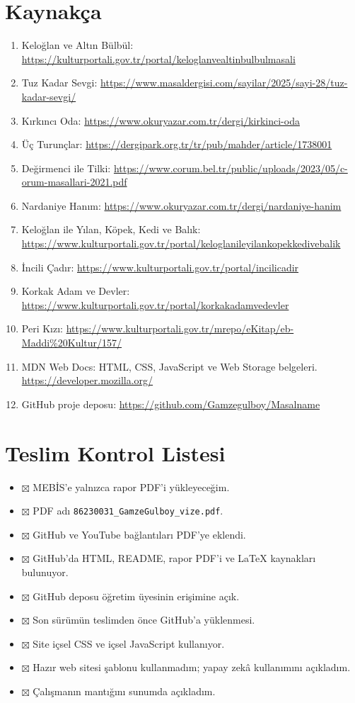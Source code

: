 \documentclass[10pt,a4paper]{article}
\begin{document}
\section{Kaynakça}
\begin{enumerate}\sloppy
\item Keloğlan ve Altın Bülbül: \url{https://kulturportali.gov.tr/portal/keloglanvealtinbulbulmasali}
\item Tuz Kadar Sevgi: \url{https://www.masaldergisi.com/sayilar/2025/sayi-28/tuz-kadar-sevgi/}
\item Kırkıncı Oda: \url{https://www.okuryazar.com.tr/dergi/kirkinci-oda}
\item Üç Turunçlar: \url{https://dergipark.org.tr/tr/pub/mahder/article/1738001}
\item Değirmenci ile Tilki: \url{https://www.corum.bel.tr/public/uploads/2023/05/c-orum-masallari-2021.pdf}
\item Nardaniye Hanım: \url{https://www.okuryazar.com.tr/dergi/nardaniye-hanim}
\item Keloğlan ile Yılan, Köpek, Kedi ve Balık: \url{https://www.kulturportali.gov.tr/portal/keloglanileyilankopekkedivebalik}
\item İncili Çadır: \url{https://www.kulturportali.gov.tr/portal/incilicadir}
\item Korkak Adam ve Devler: \url{https://www.kulturportali.gov.tr/portal/korkakadamvedevler}
\item Peri Kızı: \url{https://www.kulturportali.gov.tr/mrepo/eKitap/eb-Maddi%20Kultur/157/}
\item MDN Web Docs: HTML, CSS, JavaScript ve Web Storage belgeleri. \url{https://developer.mozilla.org/}
\item GitHub proje deposu: \url{https://github.com/Gamzegulboy/Masalname}
\end{enumerate}
\appendix\section{Teslim Kontrol Listesi}
\begin{itemize}[leftmargin=*,label={}]
\item $\boxtimes$ MEBİS'e yalnızca rapor PDF'i yükleyeceğim.
\item $\boxtimes$ PDF adı \texttt{86230031\_GamzeGulboy\_vize.pdf}.
\item $\boxtimes$ GitHub ve YouTube bağlantıları PDF'ye eklendi.
\item $\boxtimes$ GitHub'da HTML, README, rapor PDF'i ve LaTeX kaynakları bulunuyor.
\item $\boxtimes$ GitHub deposu öğretim üyesinin erişimine açık.
\item $\boxtimes$ Son sürümün teslimden önce GitHub'a yüklenmesi.
\item $\boxtimes$ Site içsel CSS ve içsel JavaScript kullanıyor.
\item $\boxtimes$ Hazır web sitesi şablonu kullanmadım; yapay zekâ kullanımını açıkladım.
\item $\boxtimes$ Çalışmanın mantığını sunumda açıkladım.
\end{itemize}
\end{document}
